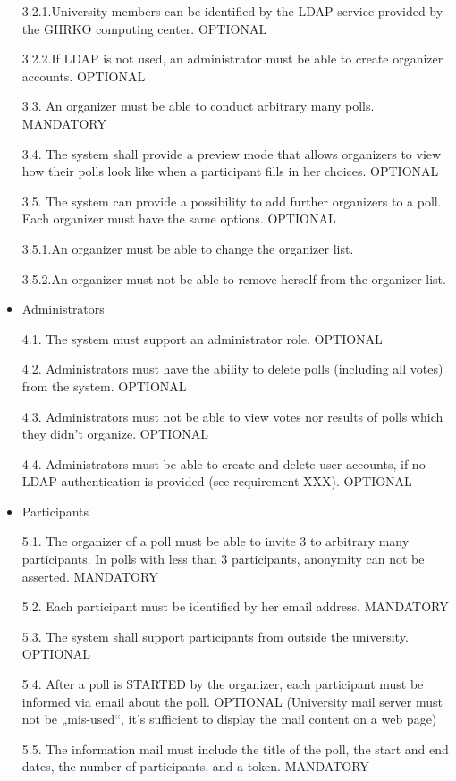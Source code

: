 \begin{itemize}
3.2.1.University members can be identified by the LDAP service provided by the GHRKO
computing center. OPTIONAL


3.2.2.If LDAP is not used, an administrator must be able to create organizer accounts. OPTIONAL


3.3. An organizer must be able to conduct arbitrary many polls. MANDATORY


3.4. The system shall provide a preview mode that allows organizers to view how their polls look
like when a participant fills in her choices. OPTIONAL


3.5. The system can provide a possibility to add further organizers to a poll. Each organizer must
have the same options. OPTIONAL


3.5.1.An organizer must be able to change the organizer list.


3.5.2.An organizer must not be able to remove herself from the organizer list.


\item Administrators


4.1. The system must support an administrator role. OPTIONAL


4.2. Administrators must have the ability to delete polls (including all votes) from the system. OPTIONAL


4.3. Administrators must not be able to view votes nor results of polls which they didn’t organize.
OPTIONAL


4.4. Administrators must be able to create and delete user accounts, if no LDAP authentication is
provided (see requirement XXX). OPTIONAL


\item Participants


5.1. The organizer of a poll must be able to invite 3 to arbitrary many participants. In polls with
less than 3 participants, anonymity can not be asserted. MANDATORY


5.2. Each participant must be identified by her email address. MANDATORY


5.3. The system shall support participants from outside the university. OPTIONAL


5.4. After a poll is STARTED by the organizer, each participant must be informed via email about
the poll. OPTIONAL (University mail server must not be „mis-used“, it’s sufficient to display
the mail content on a web page)


5.5. The information mail must include the title of the poll, the start and end dates, the number of
participants, and a token. MANDATORY



\end{itemize}
